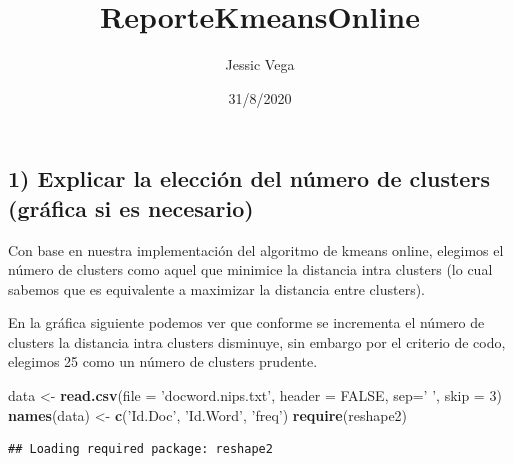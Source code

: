 \documentclass[
]{article}
\title{ReporteKmeansOnline}
\author{Jessic Vega}
\date{31/8/2020}
\newenvironment{Shaded}{\begin{snugshade}}{\end{snugshade}}
\newcommand{\DataTypeTok}[1]{\textcolor[rgb]{0.13,0.29,0.53}{#1}}
\newcommand{\DecValTok}[1]{\textcolor[rgb]{0.00,0.00,0.81}{#1}}
\newcommand{\KeywordTok}[1]{\textcolor[rgb]{0.13,0.29,0.53}{\textbf{#1}}}
\newcommand{\NormalTok}[1]{#1}
\newcommand{\OtherTok}[1]{\textcolor[rgb]{0.56,0.35,0.01}{#1}}
\newcommand{\StringTok}[1]{\textcolor[rgb]{0.31,0.60,0.02}{#1}}
\begin{document}
\maketitle

\hypertarget{explicar-la-elecciuxf3n-del-nuxfamero-de-clusters-gruxe1fica-si-es-necesario}{%
\subsection{1) Explicar la elección del número de clusters (gráfica si
es
necesario)}\label{explicar-la-elecciuxf3n-del-nuxfamero-de-clusters-gruxe1fica-si-es-necesario}}

Con base en nuestra implementación del algoritmo de kmeans online,
elegimos el número de clusters como aquel que minimice la distancia
intra clusters (lo cual sabemos que es equivalente a maximizar la
distancia entre clusters).

En la gráfica siguiente podemos ver que conforme se incrementa el número
de clusters la distancia intra clusters disminuye, sin embargo por el
criterio de codo, elegimos 25 como un número de clusters prudente.

\begin{Shaded}
\begin{Highlighting}[]
\NormalTok{data <-}\StringTok{ }\KeywordTok{read.csv}\NormalTok{(}\DataTypeTok{file =} \StringTok{'docword.nips.txt'}\NormalTok{, }\DataTypeTok{header =} \OtherTok{FALSE}\NormalTok{, }\DataTypeTok{sep=}\StringTok{' '}\NormalTok{, }\DataTypeTok{skip =} \DecValTok{3}\NormalTok{)}
\KeywordTok{names}\NormalTok{(data) <-}\StringTok{ }\KeywordTok{c}\NormalTok{(}\StringTok{'Id.Doc'}\NormalTok{, }\StringTok{'Id.Word'}\NormalTok{, }\StringTok{'freq'}\NormalTok{)}
\KeywordTok{require}\NormalTok{(reshape2)}
\end{Highlighting}
\end{Shaded}

\begin{verbatim}
## Loading required package: reshape2
\end{verbatim}
\end{document}
